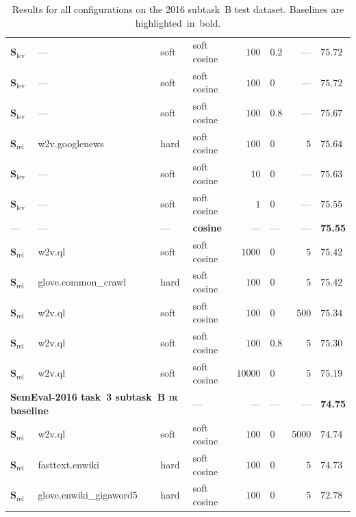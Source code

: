 \documentclass[
  digital, %
  notable, %
  lof,     %
  lot,     %
  nopalatino, color
]{fithesis3}
\newenvironment{liningfigs}{\renewcommand*{\rmdefault}{zpltlf}\normalfont}{}
\def\abbr#1{\textsc{\MakeLowercase{#1}}}
\begin{document}
\begin{table}
\begin{liningfigs}
\begin{tabular}{llllrlrl}
$\mathbf S_{\textrm{lev}}$ & --- & soft & soft cosine & $100$ & $0.2$ & --- & $75.72$ \\
$\mathbf S_{\textrm{lev}}$ & --- & soft & soft cosine & $100$ & $0$ & --- & $75.72$ \\
$\mathbf S_{\textrm{lev}}$ & --- & soft & soft cosine & $100$ & $0.8$ & --- & $75.67$ \\
$\mathbf S_{\textrm{rel}}$ & w2v.googlenews & hard & soft cosine & $100$ & $0$ & $5$ & $75.64$ \\
$\mathbf S_{\textrm{lev}}$ & --- & soft & soft cosine & $10$ & $0$ & --- & $75.63$ \\
$\mathbf S_{\textrm{lev}}$ & --- & soft & soft cosine & $1$ & $0$ & --- & $75.55$ \\
--- & --- & --- & \bfseries cosine & --- & --- & --- & \bfseries 75.55 \\
$\mathbf S_{\textrm{rel}}$ & w2v.ql & soft & soft cosine & $1000$ & $0$ & $5$ & $75.42$ \\
$\mathbf S_{\textrm{rel}}$ & glove.common\_crawl & hard & soft cosine & $100$ & $0$ & $5$ & $75.42$ \\
$\mathbf S_{\textrm{rel}}$ & w2v.ql & soft & soft cosine & $100$ & $0$ & $500$ & $75.34$ \\
$\mathbf S_{\textrm{rel}}$ & w2v.ql & soft & soft cosine & $100$ & $0.8$ & $5$ & $75.30$ \\
$\mathbf S_{\textrm{rel}}$ & w2v.ql & soft & soft cosine & $10000$ & $0$ & $5$ & $75.19$ \\
\multicolumn{3}{l}{\bfseries SemEval-2016 task~3 subtask~B \abbr{IR}\index{ir@\protect\abbr{IR}} baseline} &
  --- &
  --- &
  --- &
  --- &
  \bfseries74.75 \\
$\mathbf S_{\textrm{rel}}$ & w2v.ql & soft & soft cosine & $100$ & $0$ & $5000$ & $74.74$ \\
$\mathbf S_{\textrm{rel}}$ & fasttext.enwiki & hard & soft cosine & $100$ & $0$ & $5$ & $74.73$ \\
$\mathbf S_{\textrm{rel}}$ & glove.enwiki\_gigaword5 & hard & soft cosine & $100$ & $0$ & $5$ & $72.78$ \\
\end{tabular}
\end{liningfigs}
\caption[Results for all configurations on the SemEval-2016 task~3
subtask~B test dataset]{%
  Results for all configurations on the 2016 subtask~B test dataset.
  Baselines are highlighted~in~bold.}
\label{tab:similarity-results-2016}
\end{table}
\end{document}
